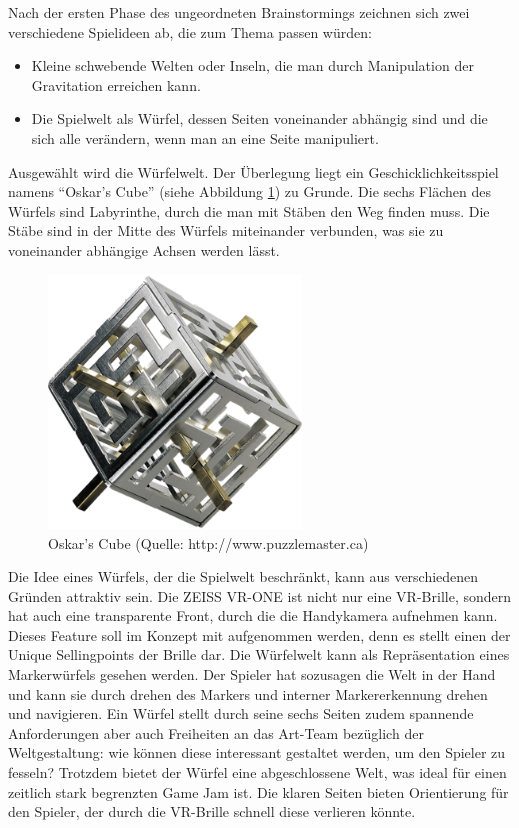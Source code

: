 
Nach der ersten Phase des ungeordneten Brainstormings zeichnen sich zwei verschiedene Spielideen ab, die zum Thema passen würden:
\begin{itemize}
\item Kleine schwebende Welten oder Inseln, die man durch Manipulation der Gravitation erreichen kann.
\item Die Spielwelt als Würfel, dessen Seiten voneinander abhängig sind und die sich alle verändern, wenn man an eine Seite manipuliert.
\end{itemize}

Ausgewählt wird die Würfelwelt. Der Überlegung liegt ein Geschicklichkeitsspiel namens \enquote{Oskar's Cube} (siehe  Abbildung \ref{fig:Oskar}) zu Grunde. Die sechs Flächen des Würfels sind Labyrinthe, durch die man mit Stäben den Weg finden muss. Die Stäbe sind in der Mitte des Würfels miteinander verbunden, was sie zu voneinander abhängige Achsen werden lässt.

\begin{figure}[ht]%
	\centering
		\includegraphics[width=0.6\textwidth]{images/oscar}
	\caption{Oskar's Cube (Quelle: http://www.puzzlemaster.ca)}
	\label{fig:Oskar}
\end{figure}

Die Idee eines Würfels, der die Spielwelt beschränkt, kann aus verschiedenen Gründen attraktiv sein. Die ZEISS VR-ONE ist nicht nur eine VR-Brille, sondern hat auch eine transparente Front, durch die die Handykamera aufnehmen kann. Dieses Feature soll im Konzept mit aufgenommen werden, denn es stellt einen der Unique Sellingpoints der Brille dar. Die Würfelwelt kann als Repräsentation eines Markerwürfels gesehen werden. Der Spieler hat sozusagen die Welt in der Hand und kann sie durch drehen des Markers und interner Markererkennung drehen und navigieren. 
Ein Würfel stellt durch seine sechs Seiten zudem spannende Anforderungen aber auch Freiheiten an das Art-Team bezüglich der Weltgestaltung: wie können diese interessant gestaltet werden, um den Spieler zu fesseln?
Trotzdem bietet der Würfel eine abgeschlossene Welt, was ideal für einen zeitlich stark begrenzten Game Jam ist. Die klaren Seiten bieten Orientierung für den Spieler, der durch die VR-Brille schnell diese verlieren könnte.   
  

